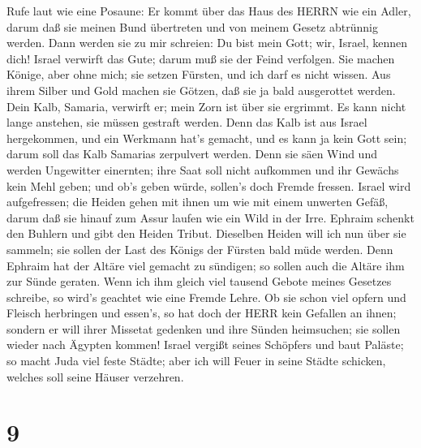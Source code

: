  Rufe laut wie eine Posaune: Er kommt über das Haus des
HERRN wie ein Adler, darum daß sie meinen Bund übertreten und von meinem
Gesetz abtrünnig werden.  Dann werden sie zu mir schreien:
Du bist mein Gott; wir, Israel, kennen dich!  Israel
verwirft das Gute; darum muß sie der Feind verfolgen.  Sie
machen Könige, aber ohne mich; sie setzen Fürsten, und ich darf es nicht
wissen. Aus ihrem Silber und Gold machen sie Götzen, daß sie ja bald
ausgerottet werden.  Dein Kalb, Samaria, verwirft er; mein
Zorn ist über sie ergrimmt. Es kann nicht lange anstehen, sie müssen
gestraft werden.  Denn das Kalb ist aus Israel hergekommen,
und ein Werkmann hat's gemacht, und es kann ja kein Gott sein; darum
soll das Kalb Samarias zerpulvert werden.  Denn sie säen
Wind und werden Ungewitter einernten; ihre Saat soll nicht aufkommen und
ihr Gewächs kein Mehl geben; und ob's geben würde, sollen's doch Fremde
fressen.  Israel wird aufgefressen; die Heiden gehen mit
ihnen um wie mit einem unwerten Gefäß,  darum daß sie hinauf
zum Assur laufen wie ein Wild in der Irre. Ephraim schenkt den Buhlern
und gibt den Heiden Tribut.  Dieselben Heiden will ich nun
über sie sammeln; sie sollen der Last des Königs der Fürsten bald müde
werden.  Denn Ephraim hat der Altäre viel gemacht zu
sündigen; so sollen auch die Altäre ihm zur Sünde geraten. 
Wenn ich ihm gleich viel tausend Gebote meines Gesetzes schreibe, so
wird's geachtet wie eine Fremde Lehre.  Ob sie schon viel
opfern und Fleisch herbringen und essen's, so hat doch der HERR kein
Gefallen an ihnen; sondern er will ihrer Missetat gedenken und ihre
Sünden heimsuchen; sie sollen wieder nach Ägypten kommen! 
Israel vergißt seines Schöpfers und baut Paläste; so macht Juda viel
feste Städte; aber ich will Feuer in seine Städte schicken, welches soll
seine Häuser verzehren.

\hypertarget{section-8}{%
\section{9}\label{section-8}}

